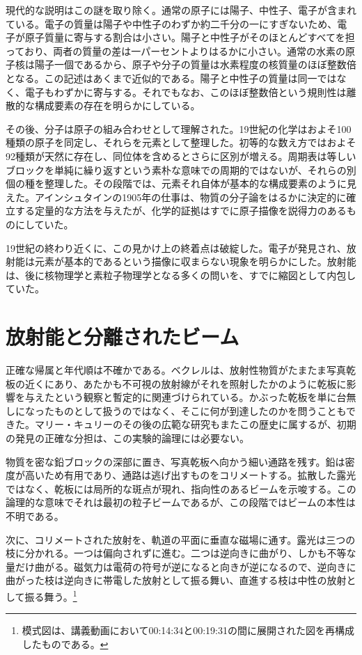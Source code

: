 現代的な説明はこの謎を取り除く。通常の原子には陽子、中性子、電子が含まれている。電子の質量は陽子や中性子のわずか約二千分の一にすぎないため、電子が原子質量に寄与する割合は小さい。陽子と中性子がそのほとんどすべてを担っており、両者の質量の差は一パーセントよりはるかに小さい。通常の水素の原子核は陽子一個であるから、原子や分子の質量は水素程度の核質量のほぼ整数倍となる。この記述はあくまで近似的である。陽子と中性子の質量は同一ではなく、電子もわずかに寄与する。それでもなお、このほぼ整数倍という規則性は離散的な構成要素の存在を明らかにしている。

その後、分子は原子の組み合わせとして理解された。19世紀の化学はおよそ100種類の原子を同定し、それらを元素として整理した。初等的な数え方ではおよそ92種類が天然に存在し、同位体を含めるとさらに区別が増える。周期表は等しいブロックを単純に繰り返すという素朴な意味での周期的ではないが、それらの別個の種を整理した。その段階では、元素それ自体が基本的な構成要素のように見えた。アインシュタインの1905年の仕事は、物質の分子論をはるかに決定的に確立する定量的な方法を与えたが、化学的証拠はすでに原子描像を説得力のあるものにしていた。

19世紀の終わり近くに、この見かけ上の終着点は破綻した。電子が発見され、放射能は元素が基本的であるという描像に収まらない現象を明らかにした。放射能は、後に核物理学と素粒子物理学となる多くの問いを、すでに縮図として内包していた。

\section{放射能と分離されたビーム}

正確な帰属と年代順は不確かである。ベクレルは、放射性物質がたまたま写真乾板の近くにあり、あたかも不可視の放射線がそれを照射したかのように乾板に影響を与えたという観察と暫定的に関連づけられている。かぶった乾板を単に台無しになったものとして扱うのではなく、そこに何が到達したのかを問うこともできた。マリー・キュリーのその後の広範な研究もまたこの歴史に属するが、初期の発見の正確な分担は、この実験的論理には必要ない。

物質を密な鉛ブロックの深部に置き、写真乾板へ向かう細い通路を残す。鉛は密度が高いため有用であり、通路は逃げ出すものをコリメートする。拡散した露光ではなく、乾板には局所的な斑点が現れ、指向性のあるビームを示唆する。この論理的な意味でそれは最初の粒子ビームであるが、この段階ではビームの本性は不明である。

次に、コリメートされた放射を、軌道の平面に垂直な磁場に通す。露光は三つの枝に分かれる。一つは偏向されずに進む。二つは逆向きに曲がり、しかも不等な量だけ曲がる。磁気力は電荷の符号が逆になると向きが逆になるので、逆向きに曲がった枝は逆向きに帯電した放射として振る舞い、直進する枝は中性の放射として振る舞う。\footnote{模式図は、講義動画において00:14:34と00:19:31の間に展開された図を再構成したものである。}

